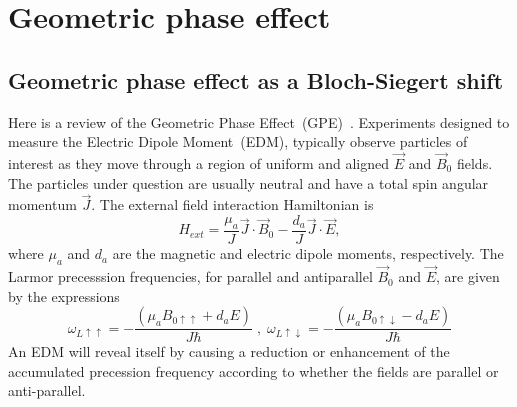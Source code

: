 \chapter{Geometric phase effect\label{app:GPE}}

\section{Geometric phase effect as a Bloch-Siegert shift}

Here is a review of the Geometric Phase Effect~(GPE)~\cite{NMR_Notes}.
Experiments designed to measure the Electric Dipole Moment~(EDM),
typically observe particles of interest as they move through a region
of uniform and aligned $\vec{E}$ and $\vec{B}_0$ fields. The particles
under question are usually neutral and have a total spin angular
momentum $\vec{J}$. The external field interaction Hamiltonian is
%
\begin{equation}
H_{ext} = \frac{\mu_a}{J}\vec{J}\cdot\vec{B}_0 - \frac{d_a}{J}\vec{J}\cdot\vec{E},
\end{equation}
%
where $\mu_a$ and $d_a$ are the magnetic and electric dipole moments,
respectively.
The Larmor precesssion frequencies, for parallel and antiparallel
$\vec{B}_0$ and $\vec{E}$, are given by the expressions
%
\begin{equation}
\label{eqn:GPEw}
\omega_{L\uparrow\uparrow} = -\frac{(\mu_a B_{0\uparrow\uparrow} + d_a E)}{J\hbar} \; , \; \omega_{L\uparrow\downarrow} = -\frac{(\mu_a B_{0\uparrow\downarrow} - d_a E)}{J\hbar} 
\end{equation}
%
An EDM will reveal itself by causing a reduction or enhancement of the
accumulated precession frequency according to whether the fields are
parallel or anti-parallel.

